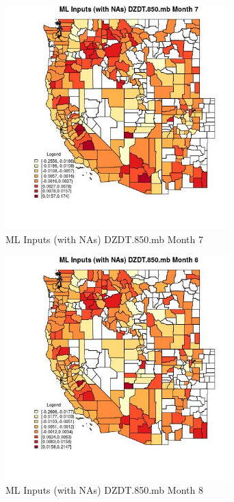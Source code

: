 \begin{figure} 
\centering  
\includegraphics[width=0.77\textwidth]{Code_Outputs/Report_ML_input_PM25_Step4_part_e_de_duplicated_aves_compiled_2019-05-21wNAs_CountyDZDT850mbmedianMonth7.jpg} 
\caption{\label{fig:Report_ML_input_PM25_Step4_part_e_de_duplicated_aves_compiled_2019-05-21wNAsCountyDZDT850mbmedianMonth7}ML Inputs (with NAs) DZDT.850.mb Month 7} 
\end{figure} 
 

\begin{figure} 
\centering  
\includegraphics[width=0.77\textwidth]{Code_Outputs/Report_ML_input_PM25_Step4_part_e_de_duplicated_aves_compiled_2019-05-21wNAs_CountyDZDT850mbmedianMonth8.jpg} 
\caption{\label{fig:Report_ML_input_PM25_Step4_part_e_de_duplicated_aves_compiled_2019-05-21wNAsCountyDZDT850mbmedianMonth8}ML Inputs (with NAs) DZDT.850.mb Month 8} 
\end{figure} 
 

